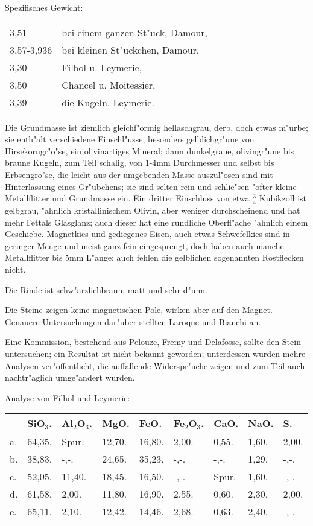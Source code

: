 \documentclass[a4paper, 11pt, oneside]{article}
\begin{document}
Spezifisches Gewicht:  
\begin{table}[!ht]
    \centering\swabfamily\Large
    \begin{tabular}{l l}
        3,51 & bei einem ganzen St"uck, Damour,\\
        3,57-3,936 & bei kleinen St"uckchen, Damour,\\
        3,30 & Filhol u. Leymerie,\\
        3,50 & Chancel u. Moitessier,\\
        3,39 & die Kugeln. Leymerie.
    \end{tabular}
\end{table}

Die Grundmasse ist ziemlich gleichf"ormig hellaschgrau, derb, doch etwas m"urbe; sie enth"alt verschiedene Einschl"usse, besonders gelblichgr"une von Hirsekorngr"o"se, ein olivinartiges Mineral; dann dunkelgraue, olivingr"une bis braune Kugeln, zum Teil schalig, von 1-4mm Durchmesser und selbst bis Erbsengro"se, die leicht aus der umgebenden Masse auszul"osen sind mit Hinterlassung eines Gr"ubchens; sie sind selten rein und schlie"sen "ofter kleine Metallflitter und Grundmasse ein. Ein dritter Einschluss von etwa $\mathfrak{\frac{3}{4}}$ Kubikzoll ist gelbgrau, "ahnlich kristallinischem Olivin, aber weniger durchscheinend und hat mehr Fettals Glasglanz; auch dieser hat eine rundliche Oberfl"ache "ahnlich einem Geschiebe. Magnetkies und gediegenes Eisen, auch etwas Schwefelkies sind in geringer Menge und meist ganz fein eingesprengt, doch haben auch manche Metallflitter bis 5mm L"ange; auch fehlen die gelblichen sogenannten Rostflecken nicht.

Die Rinde ist schw"arzlichbraun, matt und sehr d"unn.

Die Steine zeigen keine magnetischen Pole, wirken aber auf den Magnet. Genauere Untersuchungen dar"uber stellten Laroque und Bianchi an.

Eine Kommission, bestehend aus Pelouze, Fremy und Delafosse, sollte den Stein untersuchen; ein Resultat ist nicht bekannt geworden; unterdessen wurden mehre Analysen ver"offentlicht, die auffallende Widerspr"uche zeigen und zum Teil auch nachtr"aglich umge"andert wurden.

Analyse von Filhol und Leymerie:
\begin{table}[H]
    \centering\swabfamily\Large
    \begin{tabular}{l l l l l l l l l}
         & SiO$_{3}$. & Al$_{2}$O$_{3}$. & MgO. & FeO. & Fe$_{2}$O$_{3}$. & CaO. & NaO. & S. \\ \hline
        a. & 64,35. & Spur. & 12,70. & 16,80. & 2,00. & 0,55. & 1,60. & 2,00. \\
        b. & 38,83. & -,-. & 24,65. & 35,23. & -,-. & -,-. & 1,29. & -,-. \\
        c. & 52,05. & 11,40. & 18,45. & 16,50. & -,-. & Spur. & 1,60. & -,-. \\
        d. & 61,58. & 2,00. & 11,80. & 16,90. & 2,55. & 0,60. & 2,30. & 2,00. \\
        e. & 65,11. & 2,10. & 12,42. & 14,46. & 2,68. & 0,63. & 2,40. & -,-. \\
    \end{tabular}
\end{table}
\end{document}
